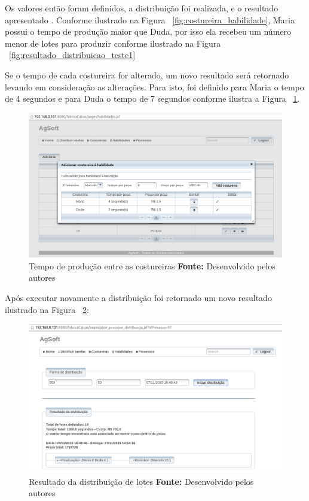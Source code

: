 \par Os valores então foram definidos, a distribuição foi realizada, e o resultado apresentado
. Conforme ilustrado na Figura ~\ref{fig:costureira_habilidade}, Maria possui
o tempo de produção maior que Duda, por isso ela recebeu um número menor de lotes
para produzir conforme ilustrado na Figura ~\ref{fig:resultado_distribuicao_teste1}

\par Se o tempo de cada costureira for alterado, um novo resultado será
retornado levando em consideração as alterações. Para isto, foi definido para
Maria o tempo de 4 segundos e para Duda o tempo de 7 segundos conforme ilustra a
Figura ~\ref{fig:tempo_costureiras}. 

\newpage

\begin{figure}[h!]
	\centerline{\includegraphics[scale=0.4]{./imagens/alterando_tempo_costureira.png}}
	\caption[Tempo de produção entre as costureiras]
	{Tempo de produção entre as costureiras \textbf{Fonte:} Desenvolvido pelos autores}
	\label{fig:tempo_costureiras}
\end{figure}

\par Após executar novamente a distribuição foi retornado um novo resultado
ilustrado na Figura ~\ref{fig:novo_resultado_distribuicao_teste1}:

\begin{figure}[h!]
	\centerline{\includegraphics[scale=0.4]{./imagens/novo_resultado_alterado_tempo_teste1.png}}
	\caption[Resultado da distribuição de lotes]
	{Resultado da distribuição de lotes \textbf{Fonte:} Desenvolvido pelos autores}
	\label{fig:novo_resultado_distribuicao_teste1}
\end{figure}

